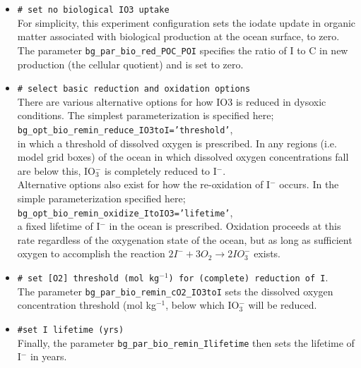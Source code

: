 \documentclass[11pt,fleqn]{book} %
\begin{document}
\begin{itemize}[noitemsep]

\vspace{1mm}
        \item \texttt{\# set no biological IO3 uptake}
        \\ For simplicity, this experiment configuration sets the iodate update in organic matter associated with biological production at the ocean surface, to zero. The parameter \texttt{bg\_par\_bio\_red\_POC\_POI} specifies the ratio of I to C in new production (the cellular quotient) and is set to zero.

\vspace{1mm}
        \item \texttt{\# select basic reduction and oxidation options}
        \\ There are various alternative options for how IO3 is reduced in dysoxic conditions. The simplest parameterization is specified here;
\\ \texttt{bg\_opt\_bio\_remin\_reduce\_IO3toI='threshold'},
\\ in which a threshold of dissolved oxygen is prescribed. In any regions (i.e. model grid boxes) of the ocean in which dissolved oxygen concentrations fall are below this, IO\(^{-}_{3}\) is completely reduced to I\(^{-}\).
\\ Alternative options also exist for how the re-oxidation of I\(^{-}\) occurs. In the simple parameterization specified here;
\\ \texttt{bg\_opt\_bio\_remin\_oxidize\_ItoIO3='lifetime'},
\\ a fixed lifetime of I\(^{-}\) in the ocean is prescribed. Oxidation proceeds at this rate regardless of the oxygenation state of the ocean, but as long as sufficient oxygen to accomplish the reaction \(2I^{-} + 3O_{2} \rightarrow 2IO^{-}_{3}\) exists.

\vspace{1mm}
        \item \texttt{\# set [O2] threshold (mol kg\(^{-1}\)) for (complete) reduction of I}.
\\ The parameter \texttt{bg\_par\_bio\_remin\_cO2\_IO3toI} sets the dissolved oxygen concentration threshold (mol kg\(^{-1}\), below which IO\(^{-}_{3}\) will be reduced.

\vspace{1mm}
        \item \texttt{\#set I lifetime (yrs)}
        \\ Finally, the parameter \texttt{bg\_par\_bio\_remin\_Ilifetime} then sets the lifetime of I\(^{-}\) in years.

\end{itemize}
\vspace{1mm}
\end{document}
